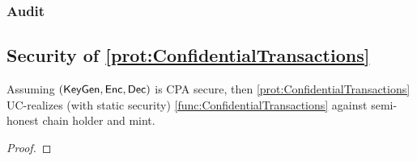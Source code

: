 
\subsubsection{Audit} 



\subsection{Security of \cref{prot:ConfidentialTransactions}}
\begin{theorem}\label{thm:ConfidentialTransactions}
Assuming  $(\mathsf{KeyGen},\mathsf{Enc},\mathsf{Dec})$ is CPA secure, then \cref{prot:ConfidentialTransactions} UC-realizes (with static security) \cref{func:ConfidentialTransactions} against semi-honest chain holder and mint.
\end{theorem}

\begin{proof}
\end{proof}

